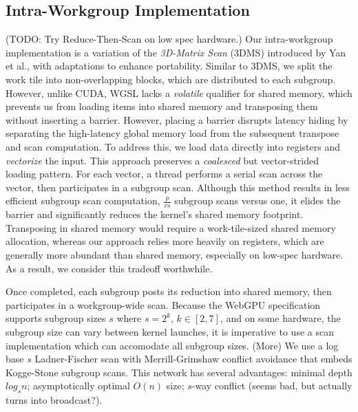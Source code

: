 \documentclass[sigconf]{acmart}
\begin{document}
\subsection{Intra-Workgroup Implementation}
 (TODO: Try Reduce-Then-Scan on low spec hardware.)
 Our intra-workgroup implementation is a variation of the \emph{3D-Matrix Scan} (3DMS) introduced by Yan et al.\cite{}, with adaptations to enhance portability. Similar to 3DMS, we split the work tile into non-overlapping blocks, which are distributed to each subgroup. However, unlike CUDA, WGSL lacks a \emph{volatile} qualifier for shared memory, which prevents us from loading items into shared memory and transposing them without inserting a barrier. However, placing a barrier disrupts latency hiding by separating the high-latency global memory load from the subsequent transpose and scan computation. To address this, we load data directly into registers and \emph{vectorize} the input. This approach preserves a \emph{coalesced} but vector-strided loading pattern. For each vector, a thread performs a serial scan across the vector, then participates in a subgroup scan. Although this method results in less efficient subgroup scan computation, $\frac{p}{vs}$ subgroup scans versus one, it elides the barrier and significantly reduces the kernel's shared memory footprint. Transposing in shared memory would require a work-tile-sized shared memory allocation, whereas our approach relies more heavily on registers, which are generally more abundant than shared memory, especially on low-spec hardware. As a result, we consider this tradeoff worthwhile.
  
 Once completed, each subgroup posts its reduction into shared memory, then participates in a workgroup-wide scan. Because the WebGPU specification supports subgroup sizes $s \text{ where } s = 2^k, \, k \in [2, 7]$, and on some hardware, the subgroup size can vary between kernel launches, it is imperative to use a scan implementation which can accomodate all subgroup sizes. (More) We use a log base $s$ Ladner-Fischer scan with Merrill-Grimshaw conflict avoidance that embeds Kogge-Stone subgroup scans\cite{}. This network has several advantages: minimal depth $log_s n$; asymptotically optimal $O(n)$ size; $s$-way conflict (seems bad, but actually turns into broadcast?).
\end{document}
